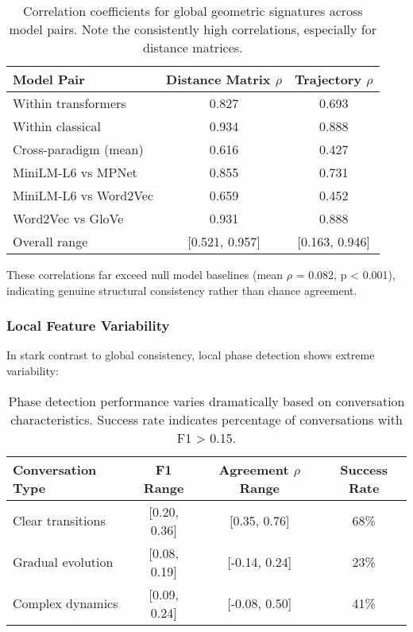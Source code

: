 \documentclass[11pt,letterpaper]{article}
\newcommand{\distanceCorrRange}{[0.521, 0.957]}
\newcommand{\transformerInternalCorr}{0.827}
\newcommand{\classicalInternalCorr}{0.934}
\newcommand{\crossParadigmCorr}{0.616}
\newcommand{\miniLMmpnetCorr}{0.855}
\newcommand{\miniLMwordTovecCorr}{0.659}
\newcommand{\wordTovecGloveCorr}{0.931}
\newcommand{\nullModelPValue}{0.001}
\newcommand{\nullBaselineCorr}{0.082}
\begin{document}
\begin{table}[h]
\centering
\begin{tabular}{lcc}
\toprule
Model Pair & Distance Matrix $\rho$ & Trajectory $\rho$ \\
\midrule
Within transformers & \transformerInternalCorr{} & 0.693 \\
Within classical & \classicalInternalCorr{} & 0.888 \\
Cross-paradigm (mean) & \crossParadigmCorr{} & 0.427 \\
\midrule
MiniLM-L6 vs MPNet & \miniLMmpnetCorr{} & 0.731 \\
MiniLM-L6 vs Word2Vec & \miniLMwordTovecCorr{} & 0.452 \\
Word2Vec vs GloVe & \wordTovecGloveCorr{} & 0.888 \\
\midrule
Overall range & \distanceCorrRange{} & [0.163, 0.946] \\
\bottomrule
\end{tabular}
\caption{Correlation coefficients for global geometric signatures across model pairs. Note the consistently high correlations, especially for distance matrices.}
\label{tab:correlations}
\end{table}

These correlations far exceed null model baselines (mean $\rho$ = \nullBaselineCorr{}, p < \nullModelPValue{}), indicating genuine structural consistency rather than chance agreement.

\subsubsection{Local Feature Variability}

In stark contrast to global consistency, local phase detection shows extreme variability:

\begin{table}[h]
\centering
\begin{tabular}{lccc}
\toprule
Conversation Type & F1 Range & Agreement $\rho$ Range & Success Rate \\
\midrule
Clear transitions & [0.20, 0.36] & [0.35, 0.76] & 68\% \\
Gradual evolution & [0.08, 0.19] & [-0.14, 0.24] & 23\% \\
Complex dynamics & [0.09, 0.24] & [-0.08, 0.50] & 41\% \\
\bottomrule
\end{tabular}
\caption{Phase detection performance varies dramatically based on conversation characteristics. Success rate indicates percentage of conversations with F1 > 0.15.}
\label{tab:phase_performance}
\end{table}
\end{document}

